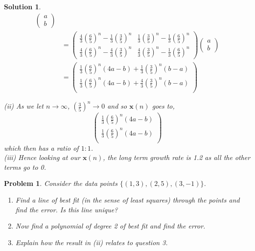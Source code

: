 \documentclass{article}
\renewcommand{\vec}[1]{\boldsymbol{\mathbf{#1}}}
\newtheorem{problem}{Problem}
\newtheorem{solution}{Solution}
\begin{document}
\begin{solution}
\begin{align*}
\begin{pmatrix}
  a \\ b
\end{pmatrix}\\
&= \begin{pmatrix}
  \frac{4}{3}\left( \frac{6}{5} \right)^n - \frac{1}{3}\left( \frac{3}{5} \right)^n & \frac{1}{3}\left( \frac{3}{5} \right)^n - \frac{1}{3}\left( \frac{6}{5} \right)^n\\
  \frac{4}{3}\left( \frac{6}{5} \right)^n - \frac{4}{3}\left( \frac{3}{5} \right)^n & \frac{4}{3}\left( \frac{3}{5} \right)^n - \frac{1}{3}\left( \frac{6}{5} \right)^n
\end{pmatrix}\begin{pmatrix}
  a \\ b
\end{pmatrix}\\
&= \begin{pmatrix}
  \frac{1}{3}\left( \frac{6}{5} \right)^n(4a  - b) + \frac{1}{3}\left(\frac{3}{5}\right)^n(b - a)\\
  \frac{1}{3}\left( \frac{6}{5} \right)^n(4a  - b) + \frac{4}{3}\left(\frac{3}{5}\right)^n(b - a)\\
\end{pmatrix}
  \end{align*}

  \noindent
  (ii) \quad As we let $n \to \infty$, $\left( \frac{3}{5} \right)^n \to 0$ and so $\vec{x}(n)$ goes to,
  $$ \begin{pmatrix}
    \frac{1}{3}\left( \frac{6}{5} \right)^n(4a  - b)\\
    \frac{1}{3}\left( \frac{6}{5} \right)^n(4a  - b)\\
  \end{pmatrix} $$
  which then has a ratio of $1 : 1$.\\

  \noindent
  (iii) \quad Hence looking at our $\vec{x}(n)$, the long term growth rate is 1.2 as all the other terms go to 0.
\end{solution}

\newpage
\begin{problem}
  Consider the data points $\{(1, 3),(2, 5),(3, -1)\}$.
  \begin{enumerate}
    \item Find a line of best fit (in the sense of least squares) through the points and find the error. Is this line unique?
    \item Now find a polynomial of degree 2 of best fit and find the error.
    \item Explain how the result in (ii) relates to question 3.
  \end{enumerate}
\end{problem}
\end{document}
